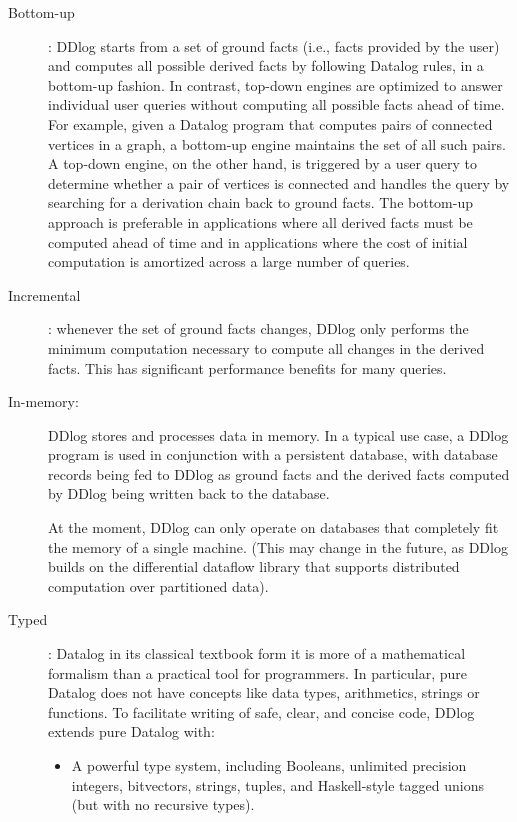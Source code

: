 \begin{description}
\item[Bottom-up]: DDlog starts from a set of ground facts (i.e., facts
  provided by the user) and computes all possible derived facts by
  following Datalog rules, in a bottom-up fashion. In contrast,
  top-down engines are optimized to answer individual user queries
  without computing all possible facts ahead of time. For example,
  given a Datalog program that computes pairs of connected vertices in
  a graph, a bottom-up engine maintains the set of all such pairs. A
  top-down engine, on the other hand, is triggered by a user query to
  determine whether a pair of vertices is connected and handles the
  query by searching for a derivation chain back to ground facts. The
  bottom-up approach is preferable in applications where all derived
  facts must be computed ahead of time and in applications where the
  cost of initial computation is amortized across a large number of
  queries.

\item[Incremental]: whenever the set of ground facts changes, DDlog
  only performs the minimum computation necessary to compute all
  changes in the derived facts. This has significant performance
  benefits for many queries.

\item[In-memory:] DDlog stores and processes data in memory. In a
  typical use case, a DDlog program is used in conjunction with a
  persistent database, with database records being fed to DDlog as
  ground facts and the derived facts computed by DDlog being written
  back to the database.

  At the moment, DDlog can only operate on databases that completely
  fit the memory of a single machine. (This may change in the future,
  as DDlog builds on the differential dataflow library that supports
  distributed computation over partitioned data).

\item[Typed]: Datalog in its classical textbook form it is more of a
  mathematical formalism than a practical tool for programmers. In
  particular, pure Datalog does not have concepts like data types,
  arithmetics, strings or functions.  To facilitate writing of safe,
  clear, and concise code, DDlog extends pure Datalog with:

  \begin{itemize}
    \item A powerful type system, including Booleans, unlimited
      precision integers, bitvectors, strings, tuples, and
      Haskell-style tagged unions (but with no recursive types).


\end{itemize}
\end{description}
